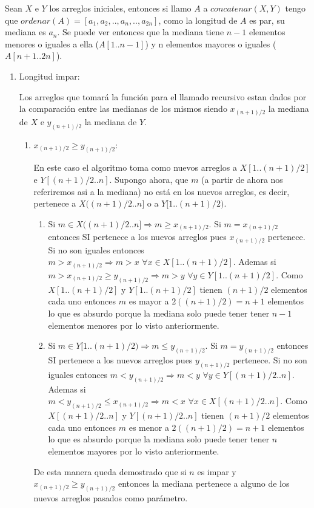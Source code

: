 \documentclass[a4paper,10pt] {article}
\begin{document}
Sean $X$ e $Y$ los arreglos iniciales, entonces si llamo $A$ a $concatenar(X,Y)$ tengo que $ordenar(A)=[a_{1},a_{2},..,a_{n},..,a_{2n}]$, como la longitud de $A$ es par, su mediana es $a_{n}$. Se puede ver entonces que la mediana tiene $n-1$ elementos menores o iguales a ella ($A[1..n-1]$) y n elementos mayores o iguales ($A[n+1..2n]$).

\begin{enumerate}
 \item Longitud impar:
  
Los arreglos que tomar\'a la funci\'on para el llamado recursivo estan dados por la comparaci\'on entre las medianas de los mismos siendo $x_{(n+1)/2}$ la mediana de $X$ e $y_{(n+1)/2}$ la mediana de $Y$.
\begin{enumerate}
\item $x_{(n+1)/2}\geq y_{(n+1)/2}$:

En este caso el algoritmo toma como nuevos arreglos a $X[1..(n+1)/2]$ e $Y[(n+1)/2..n]$. Supongo ahora, que $m$ (a partir de ahora nos referiremos asi a la mediana) no est\'a en los nuevos arreglos, es decir, pertenece a $X((n+1)/2..n]$ o a $Y[1..(n+1)/2)$.
\begin{enumerate}
\item
 Si $m \in X((n+1)/2..n] \Longrightarrow m \geq x_{(n+1)/2}$. Si $m=x_{(n+1)/2}$ entonces SI pertenece a los nuevos arreglos pues $x_{(n+1)/2}$ pertenece. Si no son iguales entonces $m>x_{(n+1)/2} \Longrightarrow m>x \,\,\forall x \in X[1..(n+1)/2]$. Ademas si $m>x_{(n+1)/2}\geq y_{(n+1)/2} \Longrightarrow m>y \,\,\forall y \in Y[1..(n+1)/2]$. Como $X[1..(n+1)/2]$ y $Y[1..(n+1)/2]$ tienen $(n+1)/2$ elementos cada uno entonces $m$ es mayor a $2((n+1)/2)=n+1$ elementos lo que es absurdo porque la mediana solo puede tener tener $n-1$ elementos menores por lo visto anteriormente.
\item
 Si $m \in Y[1..(n+1)/2) \Longrightarrow m \leq y_{(n+1)/2}$. Si $m=y_{(n+1)/2}$ entonces SI pertenece a los nuevos arreglos pues $y_{(n+1)/2}$ pertenece. Si no son iguales entonces $m<y_{(n+1)/2} \Longrightarrow m<y \,\,\forall y \in Y[(n+1)/2..n]$. Ademas si $m<y_{(n+1)/2}\leq x_{(n+1)/2} \Longrightarrow m<x \,\,\forall x \in X[(n+1)/2..n]$. Como $X[(n+1)/2..n]$ y $Y[(n+1)/2..n]$ tienen $(n+1)/2$ elementos cada uno entonces $m$ es menor a $2((n+1)/2)=n+1$ elementos lo que es absurdo porque la mediana solo puede tener tener $n$ elementos mayores por lo visto anteriormente.
\end{enumerate}

De esta manera queda demostrado que si $n$ es impar y $x_{(n+1)/2}\geq y_{(n+1)/2}$ entonces la mediana pertenece a alguno de los nuevos arreglos pasados como par\'ametro.


\end{enumerate}
\end{enumerate}
\end{document}
